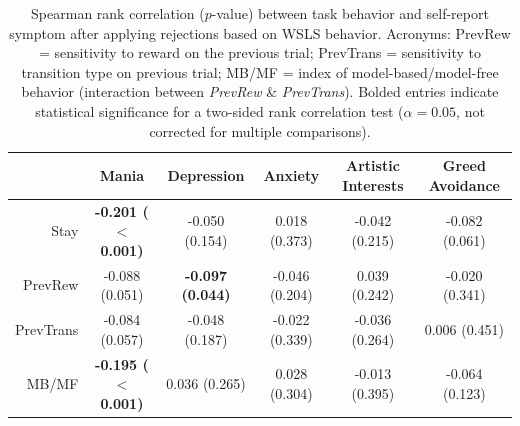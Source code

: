 \documentclass[a4paper,notitlepage,12pt]{article}
\begin{document}
\begin{table}[H]
    \centering
    \begin{adjustbox}{center}   
    \small
    \begin{tabular}{rccccc}
        \toprule
        {} & Mania & Depression & Anxiety & Artistic Interests & Greed Avoidance \\
        \midrule
        Stay      &  \textbf{-0.201 ($<$0.001)} &           -0.050 (0.154) &   0.018 (0.373) &  -0.042 (0.215) &  -0.082 (0.061) \\
        PrevRew   &              -0.088 (0.051) &  \textbf{-0.097 (0.044)} &  -0.046 (0.204) &   0.039 (0.242) &  -0.020 (0.341) \\
        PrevTrans &              -0.084 (0.057) &           -0.048 (0.187) &  -0.022 (0.339) &  -0.036 (0.264) &   0.006 (0.451) \\
        MB/MF     &  \textbf{-0.195 ($<$0.001)} &            0.036 (0.265) &   0.028 (0.304) &  -0.013 (0.395) &  -0.064 (0.123) \\
        \bottomrule
    \end{tabular}
    \end{adjustbox}
    \caption{Spearman rank correlation ($p$-value) between task behavior and self-report symptom after applying rejections based on WSLS behavior. Acronyms: PrevRew = sensitivity to reward on the previous trial; PrevTrans = sensitivity to transition type on previous trial; MB/MF = index of model-based/model-free behavior (interaction between \textit{PrevRew} \& \textit{PrevTrans}). Bolded entries indicate statistical significance for a two-sided rank correlation test ($\alpha = 0.05$, not corrected for multiple comparisons).}
\end{table}
\end{document}

